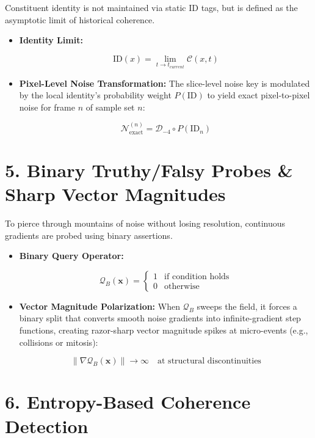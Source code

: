 Constituent identity is not maintained via static ID tags, but is defined as the asymptotic limit of historical coherence.

\begin{itemize}
\item \textbf{Identity Limit:}

\[
\text{ID}(x) = \lim_{t \to t_{current}} \mathcal{C}(x, t)
\]
\item \textbf{Pixel-Level Noise Transformation:} The slice-level noise key is modulated by the local identity's probability weight \(P(\text{ID})\) to yield exact pixel-to-pixel noise for frame \(n\) of sample set \(n\):

\[
\mathcal{N}_{\text{exact}}^{(n)} = \mathcal{D}_{-4} \circ P(\text{ID}_n)
\]
\end{itemize}

\medskip

\section{\texorpdfstring{5. Binary Truthy/Falsy Probes \& Sharp Vector Magnitudes}{5. Binary Truthy/Falsy Probes \& Sharp Vector Magnitudes}}

To pierce through mountains of noise without losing resolution, continuous gradients are probed using binary assertions.

\begin{itemize}
\item \textbf{Binary Query Operator:}

\[
\mathcal{Q}_B(\mathbf{x}) = \begin{cases} 1 & \text{if condition holds} \\ 0 & \text{otherwise} \end{cases}
\]
\item \textbf{Vector Magnitude Polarization:} When \(\mathcal{Q}_B\) sweeps the field, it forces a binary split that converts smooth noise gradients into infinite-gradient step functions, creating razor-sharp vector magnitude spikes at micro-events (e.g., collisions or mitosis):

\[
\|\nabla \mathcal{Q}_B(\mathbf{x})\| \to \infty \quad \text{at structural discontinuities}
\]
\end{itemize}

\medskip

\section{\texorpdfstring{6. Entropy-Based Coherence Detection}{6. Entropy-Based Coherence Detection}}

